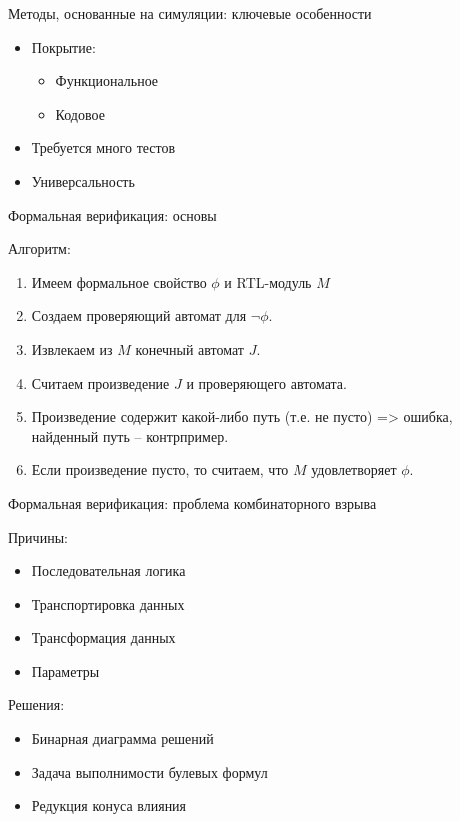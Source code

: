 \documentclass[table]{beamer}
\begin{document}
	\begin{frame}{Методы, основанные на симуляции: ключевые особенности}
		
		\begin{itemize}
			\item Покрытие: 
				\begin{itemize}
					\item Функциональное
					\item Кодовое
				\end{itemize}
			\item Требуется много тестов
			\item Универсальность
		\end{itemize}
		
	\end{frame}
	
	\begin{frame}{Формальная верификация: основы}
		
		\begin{block}{Алгоритм:}
			\begin{enumerate}
				\item[0.] Имеем формальное свойство $\phi$ и RTL-модуль $M$
				\item[1.] Создаем проверяющий автомат для $\neg \phi$.
				\item[2.] Извлекаем из $M$ конечный автомат $J$.
				\item[3.] Считаем произведение $J$ и проверяющего автомата.
				\item[4.] Произведение содержит какой-либо путь (т.е. не пусто) => ошибка, найденный путь \--- контрпример.
				\item[5.] Если произведение пусто, то считаем, что $M$ удовлетворяет $\phi$.
			\end{enumerate}
		\end{block}
		
	\end{frame}
	
	\begin{frame}{Формальная верификация: проблема комбинаторного взрыва}
		
		\begin{block}{Причины:}
			\begin{itemize}
				\item Последовательная логика
				\item Транспортировка данных 
				\item Трансформация данных
				\item Параметры
			\end{itemize}
		\end{block}
		
		\begin{block}{Решения:}
			\begin{itemize}
				\item Бинарная диаграмма решений
				\item Задача выполнимости булевых формул
				\item Редукция конуса влияния
			\end{itemize}
		\end{block}
		
	\end{frame}
	
\end{document}
